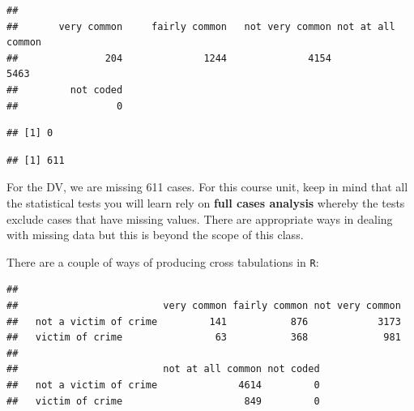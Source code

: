 \documentclass[
]{book}
\newenvironment{Shaded}{\begin{snugshade}}{\end{snugshade}}
\newcommand{\CommentTok}[1]{\textcolor[rgb]{0.56,0.35,0.01}{\textit{#1}}}
\newcommand{\FunctionTok}[1]{\textcolor[rgb]{0.00,0.00,0.00}{#1}}
\newcommand{\NormalTok}[1]{#1}
\newcommand{\SpecialCharTok}[1]{\textcolor[rgb]{0.00,0.00,0.00}{#1}}
\begin{document}
\begin{verbatim}
## 
##       very common     fairly common   not very common not at all common 
##               204              1244              4154              5463 
##         not coded 
##                 0
\end{verbatim}

\begin{Shaded}
\end{Shaded}

\begin{verbatim}
## [1] 0
\end{verbatim}

\begin{Shaded}
\end{Shaded}

\begin{verbatim}
## [1] 611
\end{verbatim}

For the DV, we are missing 611 cases. For this course unit, keep in mind that all the statistical tests you will learn rely on \textbf{full cases analysis} whereby the tests exclude cases that have missing values. There are appropriate ways in dealing with missing data but this is beyond the scope of this class.

There are a couple of ways of producing cross tabulations in \texttt{R}:

\begin{Shaded}
\end{Shaded}

\begin{verbatim}
##                        
##                         very common fairly common not very common
##   not a victim of crime         141           876            3173
##   victim of crime                63           368             981
##                        
##                         not at all common not coded
##   not a victim of crime              4614         0
##   victim of crime                     849         0
\end{verbatim}
\end{document}
